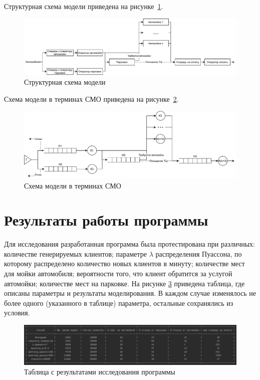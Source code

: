 \documentclass[14pt, a4paper]{extarticle}
\begin{document}
\clearpage
Структурная схема модели приведена на рисунке~\ref{pic:01}.
\begin{figure}[h]
	\begin{center}
		{\includegraphics[scale=0.7]{pictures/2-1.pdf}
			\caption{Структурная схема модели}
			\label{pic:01}}
	\end{center}
\end{figure}


Схема модели в терминах СМО приведена на рисунке~\ref{pic:02}.
\begin{figure}[h]
	\begin{center}
		{\includegraphics[scale=0.7]{pictures/2-2.pdf}
			\caption{Схема модели в терминах СМО}
			\label{pic:02}}
	\end{center}
\end{figure}

\section{Результаты работы программы}

Для исследования разработанная программа была протестирована при различных: количестве генерируемых клиентов; параметре $\lambda$ распределения Пуассона, по которому распределено количество новых клиентов в минуту; количестве мест для мойки автомобиля; вероятности того, что клиент обратится за услугой автомойки; количестве мест на парковке. На рисунке \ref{pic:res} приведена таблица, где описаны параметры и результаты моделирования. В каждом случае изменялось не более одного (указанного в таблице) параметра, остальные сохранялись из условия. 

\begin{figure}[h]
	\begin{center}
		{\includegraphics[scale=0.5]{pictures/res.png}
			\caption{Таблица с результатами исследования программы}
			\label{pic:res}}
	\end{center}
\end{figure}
\end{document}
